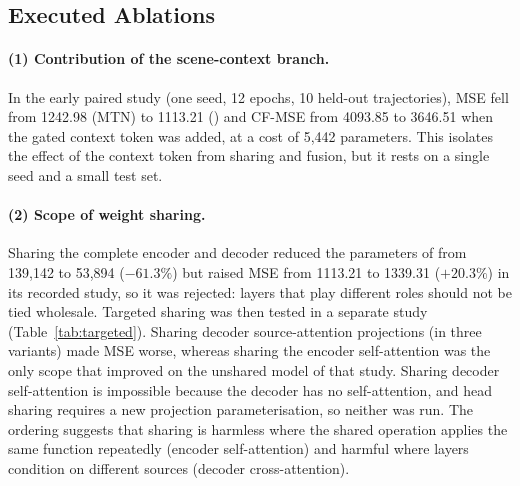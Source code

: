 \subsection{Executed Ablations}
\paragraph{(1) Contribution of the scene-context branch.}
In the early paired study (one seed, 12 epochs, 10 held-out trajectories), MSE fell from 1242.98 (MTN) to 1113.21 (\CAMTN) and CF-MSE from 4093.85 to 3646.51 when the gated context token was added, at a cost of 5,442 parameters. This isolates the effect of the context token from sharing and fusion, but it rests on a single seed and a small test set.

\paragraph{(2) Scope of weight sharing.}
Sharing the complete encoder and decoder reduced the parameters of \CAMTN from 139,142 to 53,894 ($-61.3\%$) but raised MSE from 1113.21 to 1339.31 ($+20.3\%$) in its recorded study, so it was rejected: layers that play different roles should not be tied wholesale. Targeted sharing was then tested in a separate study (Table~\ref{tab:targeted}). Sharing decoder source-attention projections (in three variants) made MSE worse, whereas sharing the encoder self-attention was the only scope that improved on the unshared model of that study. Sharing decoder self-attention is impossible because the decoder has no self-attention, and head sharing requires a new projection parameterisation, so neither was run. The ordering suggests that sharing is harmless where the shared operation applies the same function repeatedly (encoder self-attention) and harmful where layers condition on different sources (decoder cross-attention).

\begin{table}[t]
\centering
\caption{Targeted-sharing study (separate protocol with its own unshared reference model; test MSE and final-step centre error CF-MSE, squared pixels).}
\label{tab:targeted}
\scriptsize{}
\end{table}

